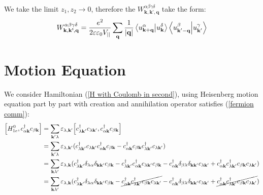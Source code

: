 \documentclass[12pt,english,a4paper]{article}
\newcommand{\dg}{\dagger}
\begin{document}
\begin{appendices}
\begin{align}
\end{align}
\quad We take the limit $z_1, z_2 \to 0$, therefore the $W^{\alpha\beta\gamma \delta}_{\textbf{k},\textbf{k'},\textbf{q}}$ take the form:
\begin{equation}
	W^{\alpha\beta\gamma \delta}_{\textbf{k},\textbf{k'},\textbf{q}} = \frac{e^2}{2\varepsilon \varepsilon_0 V_{||}} \sum_{\textbf{q}} \frac{1}{|\textbf{q}|} \braket{u_{\textbf{k}+\textbf{q}}^{\alpha}}{u^{\delta}_{\textbf{k}}} \braket{u ^{\beta}_{\textbf{k}'-\textbf{q}}}{u^\gamma_{\textbf{k}'}}
\end{equation}
\newpage
\section{Motion Equation}
\label{Motion Equation}
\quad We consider Hamiltonian (\ref{H with Coulomb in second}), using Heisenberg motion equation part by part with creation and annihilation operator satisfies (\ref{fermion comm}):
\begin{align}
	\comm{H^{0}_{1e}}{c^\dg_{\alpha \textbf{k}} c_{\beta \textbf{k}}} &= \sum_{\textbf{k}' \lambda} \varepsilon_{\lambda,\textbf{k}'} \comm{c^\dg_{\lambda \textbf{k}'} c_{\lambda \textbf{k}'}}{c^\dg_{\alpha \textbf{k}} c_{\beta \textbf{k}}} \nonumber \\
	&= \sum_{\textbf{k}' \lambda} \varepsilon_{\lambda,\textbf{k}'} (c^\dg_{\lambda \textbf{k}'} c_{\lambda \textbf{k}'}c^\dg_{\alpha \textbf{k}} c_{\beta \textbf{k}} - c^\dg_{\alpha \textbf{k}} c_{\beta \textbf{k}}c^\dg_{\lambda \textbf{k}'} c_{\lambda \textbf{k}'})\nonumber \\
	& = \sum_{\textbf{k}\lambda'} \varepsilon_{\lambda,\textbf{k}}(c^\dg_{\lambda \textbf{k}'} \delta_{\lambda \alpha}\delta_{\textbf{k}\textbf{k}'} c_{\beta \textbf{k}} 
	- c^\dg_{\lambda \textbf{k}'}c^\dg_{\alpha \textbf{k}} c_{\lambda \textbf{k}'} c_{\beta \textbf{k}} 
	- c^\dg_{\alpha \textbf{k}} \delta_{\beta\lambda}\delta_{\textbf{k}\textbf{k}'} c_{\lambda \textbf{k}'} 
	+ c^\dg_{\alpha \textbf{k}}c^\dg_{\lambda \textbf{k}'} c_{\beta \textbf{k}} c_{\lambda \textbf{k}'}) \nonumber\\
	&= \sum_{\textbf{k}\lambda'} \varepsilon_{\lambda,\textbf{k}}(c^\dg_{\lambda \textbf{k}'} \delta_{\lambda \alpha}\delta_{\textbf{k}\textbf{k}'} c_{\beta \textbf{k}} 
	- \cancel{c^\dg_{\alpha \textbf{k}}c^\dg_{\lambda \textbf{k}'} c_{\beta \textbf{k}} c_{\lambda \textbf{k}'} }
	- c^\dg_{\alpha \textbf{k}} \delta_{\beta\lambda}\delta_{\textbf{k}\textbf{k}'} c_{\lambda \textbf{k}'} 
	+ \cancel{c^\dg_{\alpha \textbf{k}}c^\dg_{\lambda \textbf{k}'} c_{\beta \textbf{k}} c_{\lambda \textbf{k}'}})\nonumber\\\label{Energy commu}

\end{align}
\end{appendices}
\end{document}
